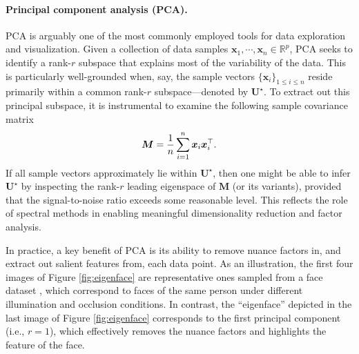 \paragraph{Principal component analysis (PCA).}
PCA is arguably one of the most commonly employed tools for data exploration and visualization.
Given a collection of data samples $\bm{x}_1, \cdots, \bm{x}_n\in\mathbb{R}^p$,
PCA seeks to identify a rank-$r$ subspace that explains most of the variability of the data.
This is particularly well-grounded when, say, the sample vectors $\{\bm{x}_i\}_{1\leq i\leq n}$ reside primarily within a common rank-$r$ subspace---denoted by $\bm{U}^{\star}$.
To extract out this principal subspace,  it is instrumental to examine the following sample covariance matrix
%
\begin{align*}
	\bm{M} = \frac{1}{n} \sum_{i=1}^n {\boldsymbol x}_i {\boldsymbol x}_i ^\top .
\end{align*}
%
If all sample vectors approximately lie within $\bm{U}^{\star}$, then one might be able to infer
$\bm{U}^{\star}$ by inspecting the rank-$r$ leading eigenspace of $\bm{M}$ (or its variants), provided that the signal-to-noise ratio exceeds some reasonable level.  This reflects the role of spectral methods in enabling meaningful dimensionality reduction and factor analysis.


In practice, a key benefit of  PCA is its ability to  remove  nuance factors in, and  extract out salient features from,  each data point.  As an illustration, the first four images of Figure \ref{fig:eigenface} are representative ones sampled from a face dataset \citep{georghiades2001few}, which correspond to faces of the same person under different illumination and occlusion conditions. In contrast, the ``eigenface'' \citep{turk1991face} depicted in the last image of Figure \ref{fig:eigenface}  corresponds to the first principal component (i.e., $r=1$), which effectively removes the nuance factors and highlights the feature of the face.





